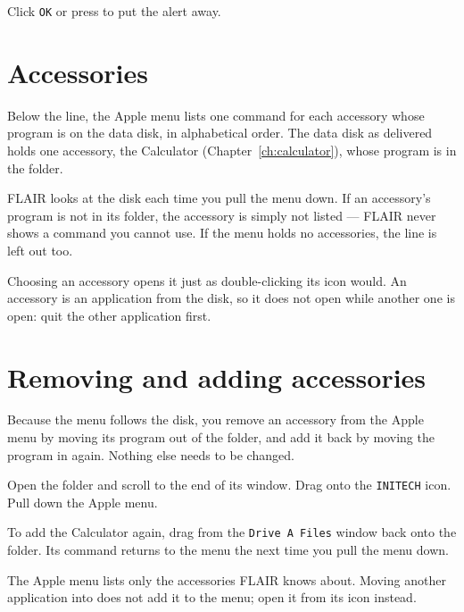 Click \texttt{OK} or press  to put the alert away.

\section{Accessories}
Below the line, the Apple menu lists one command for each accessory whose
program is on the data disk, in alphabetical order.  The data disk as
delivered holds one accessory, the Calculator (Chapter~\ref{ch:calculator}), whose program is
 in the  folder.

FLAIR looks at the disk each time you pull the menu down.  If an
accessory's program is not in its folder, the accessory is simply not
listed --- FLAIR never shows a command you cannot use.  If the menu holds
no accessories, the line is left out too.

Choosing an accessory opens it just as double-clicking its icon would.  An
accessory is an application from the disk, so it does not open while
another one is open: quit the other application first.

\section{Removing and adding accessories}
Because the menu follows the disk, you remove an accessory from the Apple
menu by moving its program out of the  folder, and add it back
by moving the program in again.  Nothing else needs to be changed.
\begin{TaskSteps}
\Step Open the  folder and scroll to the end of its window.
\Step Drag  onto the \texttt{INITECH} icon.
\Step Pull down the Apple menu.
\end{TaskSteps}


To add the Calculator again, drag  from the
\texttt{Drive A Files} window back onto the  folder.  Its
command returns to the menu the next time you pull the menu down.

The Apple menu lists only the accessories FLAIR knows about.  Moving
another application into  does not add it to the menu; open it
from its icon instead.
